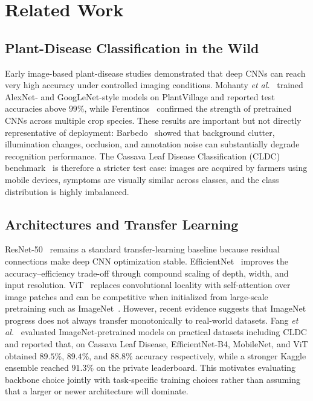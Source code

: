 \documentclass[conference]{IEEEtran}
\begin{document}

\section{Related Work}
\label{sec:related}

\subsection{Plant-Disease Classification in the Wild}
Early image-based plant-disease studies demonstrated that deep CNNs can reach very high accuracy under controlled imaging conditions. Mohanty \emph{et al.}~\cite{mohanty2016plantdisease} trained AlexNet- and GoogLeNet-style models on PlantVillage and reported test accuracies above $99\%$, while Ferentinos~\cite{ferentinos2018} confirmed the strength of pretrained CNNs across multiple crop species. These results are important but not directly representative of deployment: Barbedo~\cite{barbedo2018} showed that background clutter, illumination changes, occlusion, and annotation noise can substantially degrade recognition performance. The Cassava Leaf Disease Classification (CLDC) benchmark~\cite{mwebaze2020cassava,kaggle2020cassava} is therefore a stricter test case: images are acquired by farmers using mobile devices, symptoms are visually similar across classes, and the class distribution is highly imbalanced.

\subsection{Architectures and Transfer Learning}
ResNet-50~\cite{he2016resnet} remains a standard transfer-learning baseline because residual connections make deep CNN optimization stable. EfficientNet~\cite{tan2019efficientnet} improves the accuracy--efficiency trade-off through compound scaling of depth, width, and input resolution. ViT~\cite{dosovitskiy2021vit} replaces convolutional locality with self-attention over image patches and can be competitive when initialized from large-scale pretraining such as ImageNet~\cite{deng2009imagenet}. However, recent evidence suggests that ImageNet progress does not always transfer monotonically to real-world datasets. Fang \emph{et al.}~\cite{fang2023imagenettransfer} evaluated ImageNet-pretrained models on practical datasets including CLDC and reported that, on Cassava Leaf Disease, EfficientNet-B4, MobileNet, and ViT obtained $89.5\%$, $89.4\%$, and $88.8\%$ accuracy respectively, while a stronger Kaggle ensemble reached $91.3\%$ on the private leaderboard. This motivates evaluating backbone choice jointly with task-specific training choices rather than assuming that a larger or newer architecture will dominate.
\end{document}
